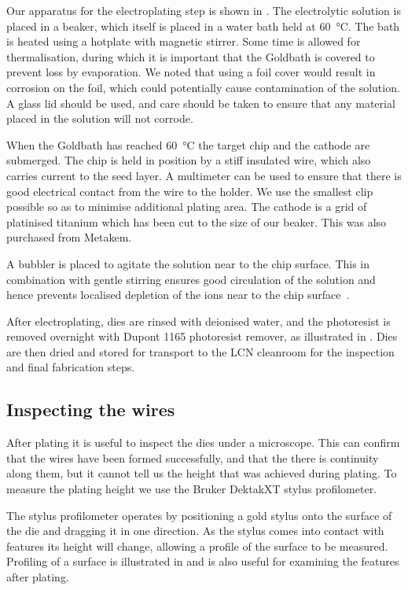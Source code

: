 Our apparatus for the electroplating step is shown in
. The electrolytic solution is placed in a
beaker, which itself is placed in a water bath held at \SI{60}{\celsius}. The
bath is heated using a hotplate with magnetic stirrer. Some time is allowed for
thermalisation, during which it is important that the Goldbath is covered to
prevent loss by evaporation. We noted that using a foil cover would result in
corrosion on the foil, which could potentially cause contamination of the
solution. A glass lid should be used, and care should be taken to ensure that
any material placed in the solution will not corrode.

When the Goldbath has reached \SI{60}{\celsius} the target chip and the cathode
are submerged. The chip is held in position by a stiff insulated wire, which
also carries current to the seed layer. A multimeter can be used to ensure that
there is good electrical contact from the wire to the holder. We use the
smallest clip possible so as to minimise additional plating area. The cathode
is a grid of platinised titanium which has been cut to the size of our beaker.
This was also purchased from Metakem.

A bubbler is placed to agitate the solution near to the chip surface. This in
combination with gentle stirring ensures good circulation of the solution and
hence prevents localised depletion of the ions near to the chip
surface~\cite{Schlesinger2011, SEtienne2020}. 

After electroplating, dies are rinsed with deionised water, and the photoresist
is removed overnight with Dupont 1165 photoresist remover, as illustrated
in . Dies are then
dried and stored for transport to the LCN cleanroom for the inspection and
final fabrication steps.


\subsection{Inspecting the wires}
\label{fab:inspwire}

After plating it is useful to inspect the dies under a microscope. This can
confirm that the wires have been formed successfully, and that the there
is continuity along them, but it cannot tell us the height that was achieved
during plating. To measure the plating height we use 
the Bruker DektakXT stylus profilometer.

The stylus profilometer operates by positioning a gold stylus onto the surface of
the die and dragging it in one direction. As the stylus comes into contact with
features its height will change, allowing a profile of the surface to be
measured. Profiling of a surface is illustrated in 
and is also useful for examining the features after plating.


